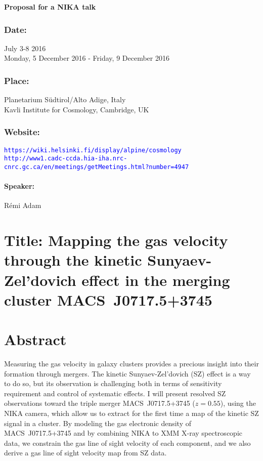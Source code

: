 \documentclass[a4paper]{article}
\begin{document}
\begin{center}{\bf \LARGE Proposal for a NIKA talk}\end{center}
\vspace{1cm}

\vspace{1cm}

\subsubsection*{Date:}
July 3-8 2016\\
Monday, 5 December 2016 - Friday, 9 December 2016

\subsubsection*{Place:}
Planetarium Südtirol/Alto Adige, Italy\\
Kavli Institute for Cosmology, Cambridge, UK
 
\subsubsection*{Website:}
{\tt \textcolor{blue}{https://wiki.helsinki.fi/display/alpine/cosmology}}\\
{\tt \textcolor{blue}{http://www1.cadc-ccda.hia-iha.nrc-cnrc.gc.ca/en/meetings/getMeetings.html?number=4947}}

\paragraph{Speaker:}
R\'emi Adam

\section*{Title: Mapping the gas velocity through the kinetic Sunyaev-Zel'dovich effect in the merging cluster MACS~J0717.5+3745}

\section*{Abstract}
Measuring the gas velocity in galaxy clusters provides a precious insight into their formation through mergers. The kinetic Sunyaev-Zel'dovich (SZ) effect is a way to do so, but its observation is challenging both in terms of sensitivity requirement and control of systematic effects. I will present resolved SZ observations toward the triple merger \mbox{MACS~J0717.5+3745} ($z=0.55$), using the NIKA camera, which allow us to extract for the first time a map of the kinetic SZ signal in a cluster. By modeling the gas electronic density of \mbox{MACS~J0717.5+3745} and by combining NIKA to XMM X-ray spectroscopic data, we constrain the gas line of sight velocity of each component, and we also derive a gas line of sight velocity map from SZ data.
\end{document}
